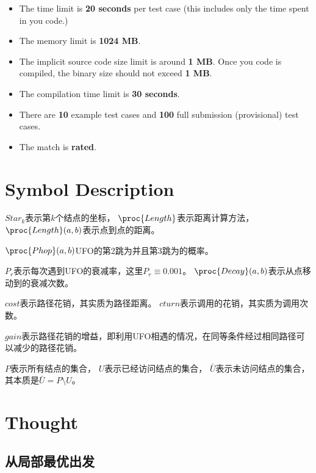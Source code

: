 \documentclass[hyperref,UTF8]{ctexart}
\theoremstyle{definition}
\theoremstyle{remark}
\numberwithin{equation}{subsection}
\newcommand{\Emph}{\textbf}
\begin{document}
	\begin{itemize}
	
		\item The time limit is \Emph{20 seconds} per test case (this includes only the time spent in you code.)
		
		\item The memory limit is \Emph{1024 MB}.
		
		\item The implicit source code size limit is around \Emph{1 MB}.
		Once you code is compiled, the binary size should not exceed \Emph{1 MB}.
		
		\item The compilation time limit is \Emph{30 seconds}.
		
		\item There are \Emph{10} example test cases and \Emph{100} full submission (provisional) test cases.

		\item The match is \Emph{rated}.
		
	\end{itemize}
	
\section{Symbol Description}
\label{sec:symbol_descrip}

	$Star_k$表示第$k$个结点的坐标，
	$\proc{Length}$表示距离计算方法，
	$\proc{Length}(a, b)$表示点到点的距离。
	
	$\proc{Phop}(a, b)$UFO的第2跳为并且第3跳为的概率。
	
	$P_r$表示每次遇到UFO的衰减率，这里$P_r \equiv 0.001$。
	$\proc{Decay}(a, b)$表示从点移动到的衰减次数。
	
	$cost$表示路径花销，其实质为路径距离。
	$cturn$表示调用的花销，其实质为调用次数。
	
	$gain$表示路径花销的增益，即利用UFO相遇的情况，在同等条件经过相同路径可以减少的路径花销。
	
    $P$表示所有结点的集合，
	$U$表示已经访问结点的集合，
	$\bar{U}$表示未访问结点的集合，
	其本质是$\bar{U} = P \setminus U$。
	
\section{Thought}
\label{sec:thought}

\subsection{从局部最优出发}
\label{subsec:local_optimum}
\end{document}
